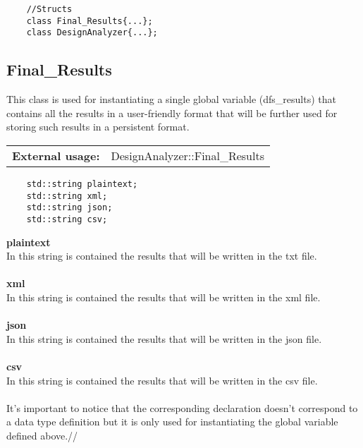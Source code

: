 \documentclass{article}
\begin{document}
\begin{mdframed}[hidealllines=true, backgroundcolor=green!10]
	\begin{lstlisting}
	//Structs
	class Final_Results{...};
	class DesignAnalyzer{...};
	\end{lstlisting}
\end{mdframed}

\subsection{Final\_Results}

This class is used for instantiating a single global variable (dfs\_results) that contains all the results in a user-friendly format that will be further used for storing such results in a persistent format.\\

\begin{tabular}{ll}
	\textbf{External usage: } & DesignAnalyzer::Final\_Results\\
\end{tabular}

\begin{mdframed}[hidealllines=true, backgroundcolor=magenta!10]
	\begin{lstlisting}
	std::string plaintext;
	std::string xml;
	std::string json;
	std::string csv;
	\end{lstlisting}
\end{mdframed}

\textbf{plaintext}\\
In this string is contained the results that will be written in the txt file.\\\\

\textbf{xml}\\
In this string is contained the results that will be written in the xml file.\\\\

\textbf{json}\\
In this string is contained the results that will be written in the json file.\\\\

\textbf{csv}\\
In this string is contained the results that will be written in the csv file.\\\\

It's important to notice that the corresponding declaration doesn't correspond to a data type definition but it is only used for instantiating the global variable defined above.//
\end{document}
